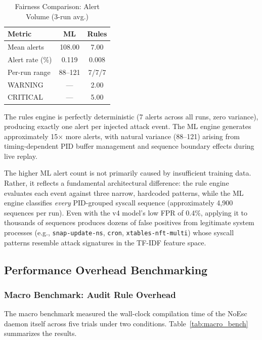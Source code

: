 \documentclass[journal]{./IEEEtran}
\begin{document}
\begin{table}[H]
    \centering
    \footnotesize
    \setlength{\tabcolsep}{4pt}
    \renewcommand{\arraystretch}{1.1}
    \caption{Fairness Comparison: Alert Volume (3-run avg.)}
    \begin{tabular}{|l|c|c|}
        \hline
        \textbf{Metric} & \textbf{ML} & \textbf{Rules} \\ \hline
        Mean alerts & 108.00 & 7.00 \\ \hline
        Alert rate (\%) & 0.119 & 0.008 \\ \hline
        Per-run range & 88--121 & 7/7/7 \\ \hline
        WARNING & --- & 2.00 \\ \hline
        CRITICAL & --- & 5.00 \\ \hline
    \end{tabular}
    \label{tab:fairness}
\end{table}

The rules engine is perfectly deterministic (7 alerts across all runs, zero variance), producing exactly one alert per injected attack event. The ML engine generates approximately 15$\times$ more alerts, with natural variance (88--121) arising from timing-dependent PID buffer management and sequence boundary effects during live replay.

The higher ML alert count is not primarily caused by insufficient training data. Rather, it reflects a fundamental architectural difference: the rule engine evaluates each event against three narrow, hardcoded patterns, while the ML engine classifies \textit{every} PID-grouped syscall sequence (approximately 4,900 sequences per run). Even with the v4 model's low FPR of 0.4\%, applying it to thousands of sequences produces dozens of false positives from legitimate system processes (e.g., \texttt{snap-update-ns}, \texttt{cron}, \texttt{xtables-nft-multi}) whose syscall patterns resemble attack signatures in the TF-IDF feature space.

\subsection{Performance Overhead Benchmarking}

\subsubsection{Macro Benchmark: Audit Rule Overhead}
The macro benchmark measured the wall-clock compilation time of the NoEsc daemon itself across five trials under two conditions. Table~\ref{tab:macro_bench} summarizes the results.
\end{document}
